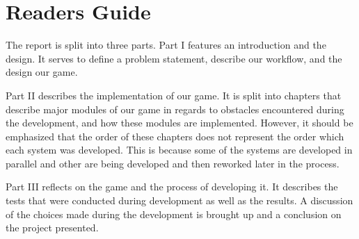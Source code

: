 \section*{Readers Guide}\label{preface:readersguide}
The report is split into three parts.
Part I features an introduction and the design.
It serves to define a problem statement, describe our workflow, and the design our game.

Part II describes the implementation of our game.
It is split into chapters that describe major modules of our game in regards to obstacles encountered during the development, and how these modules are implemented.
However, it should be emphasized that the order of these chapters does not represent the order which each system was developed.
This is because some of the systems are developed in parallel and other are being developed and then reworked later in the process.

Part III reflects on the game and the process of developing it. It describes the tests that were conducted during development as well as the results. A discussion of the choices made during the development is brought up and a conclusion on the project presented.

